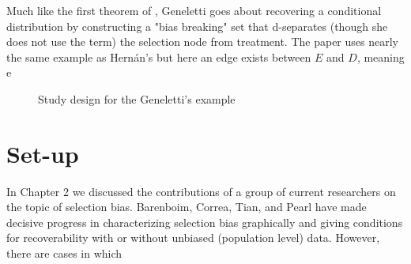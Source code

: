 \documentclass[12pt,twoside]{reedthesis}
\theoremstyle{definition}
\begin{document}
Much like the first theorem of \cite{Bareinboim_2014}, Geneletti goes about recovering a conditional distribution by constructing a "bias breaking" set that d-separates (though she does not use the term) the selection node from treatment. The paper uses nearly the same example as Hern\'an's but here an edge exists between $E$ and $D$, meaning e


\begin{figure}[H]
\begin{center}
\end{center}
\caption{Study design for the Geneletti's example}
\end{figure}



\section{Set-up}

In Chapter 2 we discussed the contributions of a group of current researchers on the topic of selection bias. Barenboim, Correa, Tian, and Pearl have made decisive progress in characterizing selection bias graphically and giving conditions for recoverability with or without unbiased (population level) data. However, there are cases in which 



  \backmatter %

    \nocite{*}
\end{document}
